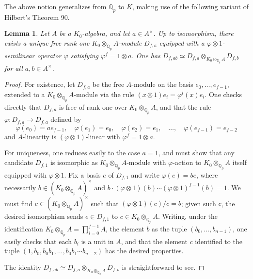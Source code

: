 \documentclass[12pt]{article}
\newtheorem{lemma}[theorem]{Lemma}
\theoremstyle{definition}
\numberwithin{equation}{theorem}
\newcommand{\QQ}{\mathbb{Q}}
\def\Qp{\QQ_p}
\begin{document}
The above notion generalizes from $\Qp$ to $K$, making use of the following variant of Hilbert's Theorem 90.

\begin{lemma}\label{L:make phi module}
Let $A$ be a $K_0$-algebra, and let $a \in A^\times$.  Up to isomorphism, there exists a unique free rank one $K_0 \otimes_{\Qp} A$-module $D_{f,a}$ equipped with a $\varphi \otimes 1$-semilinear operator $\varphi$ satisfying $\varphi^f = 1 \otimes a$.  One has $D_{f,ab} \simeq D_{f,a} \otimes_{K_0 \otimes_{\Qp} A} D_{f,b}$ for all $a,b \in A^\times$.
\end{lemma}
\begin{proof}
For existence, let $D_{f,a}$ be the free $A$-module on the basis
$e_0,\ldots,e_{f-1}$, extended to a $K_0 \otimes_{\Qp} A$-module via
the rule $(x \otimes 1)e_i = \varphi^i(x)e_i$.  One checks directly
that $D_{f,a}$ is free of rank one over $K_0 \otimes_{\Qp} A$, and
that the rule $\varphi : D_{f,a} \to D_{f,a}$ defined by
\[
\varphi(e_0) = ae_{f-1},
\quad
\varphi(e_1) = e_0,
\quad
\varphi(e_2) = e_1,
\quad \ldots, \quad
\varphi(e_{f-1}) = e_{f-2}
\]
and $A$-linearity is $(\varphi \otimes 1)$-linear with $\varphi^f = 1
\otimes a$.

For uniqueness, one reduces easily to the case $a=1$, and must show that any candidate $D_{f,1}$ is isomorphic as $K_0 \otimes_{\Qp} A$-module with $\varphi$-action to $K_0 \otimes_{\Qp} A$ itself equipped with $\varphi \otimes 1$.  Fix a basis $e$ of $D_{f,1}$ and write $\varphi(e) = be$, where necessarily $b \in (K_0 \otimes_{\Qp} A)^\times$ and $b \cdot (\varphi\otimes1)(b)\cdots(\varphi\otimes1)^{f-1}(b) = 1$.  We must find $c \in (K_0 \otimes_{\Qp} A)^\times$ such that $(\varphi \otimes 1)(c)/c = b$; given such $c$, the desired isomorphism sends $e \in D_{f,1}$ to $c \in K_0 \otimes_{\Qp} A$.  Writing, under the identification $K_0 \otimes_{\Qp} A = \prod_{i=0}^{f-1} A$, the element $b$ as the tuple $(b_0,\ldots,b_{n-1})$, one easily checks that each $b_i$ is a unit in $A$, and that the element $c$ identified to the tuple $(1,b_0,b_0b_1,\ldots,b_0b_1 \cdots b_{n-2})$ has the desired properties.

The identity $D_{f,ab} \simeq D_{f,a} \otimes_{K_0 \otimes_{\Qp} A} D_{f,b}$ is straightforward to see.
\end{proof}
\end{document}
